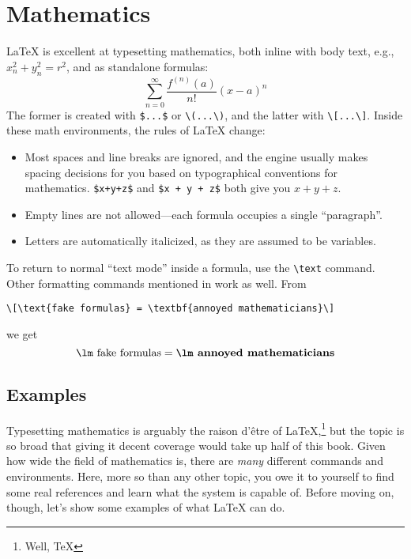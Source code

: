 \chapter{Mathematics}
\label{math}

\LaTeX{} is excellent at typesetting mathematics, both inline with body text,
e.g., $x_n^2+y_n^2=r^2$, and as standalone formulas:
\[\sum_{n=0}^{\infty} \frac{f^{(n)} (a)}{n!} (x - a)^n\]
The former is created with \verb|$...$| or \verb|\(...\)|,
and the latter with \verb|\[...\]|.
Inside these math environments, the rules of \LaTeX{} change:
\begin{itemize}
\item Most spaces and line breaks are ignored,
    and the engine usually makes spacing decisions for you based on
    typographical conventions for mathematics.
    \verb|$x+y+z$| and \verb|$x + y + z$| both give you $x+y+z$.
\item Empty lines are not allowed---each formula occupies a single
    ``paragraph''\quotekern.
\item Letters are automatically italicized, as they are assumed to be variables.
\end{itemize}
To return to normal ``text mode'' inside a formula, use the \verb|\text| command.
Other formatting commands mentioned in  work as well.
From
\begin{leftfigure}
\begin{lstlisting}
\[\text{fake formulas} = \textbf{annoyed mathematicians}\]
\end{lstlisting}
\end{leftfigure}
we get
\[\text{\lm fake formulas} = \textbf{\lm annoyed mathematicians}\]

\section{Examples}

Typesetting mathematics is arguably the raison d'être of
\LaTeX,\punckern\footnote{Well, \TeX} but the topic is so broad that giving
it decent coverage would take up half of this book.
Given how wide the field of mathematics is,
there are \emph{many} different commands and environments.
Here, more so than any other topic,
you owe it to yourself to find some real references and learn what the system
is capable of.
Before moving on, though, let's show some examples of what \LaTeX{}
can do.
\newpage

